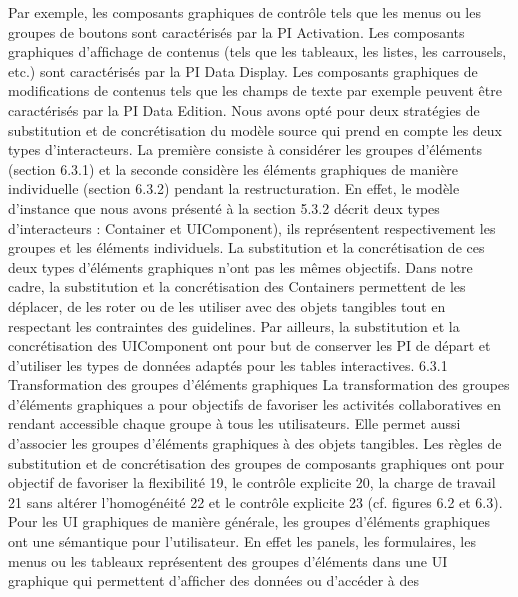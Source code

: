\documentclass{article}
\begin{document}
Par exemple, les composants graphiques de contr\^{o}le tels que les menus ou les groupes de boutons
sont caract\'{e}ris\'{e}s par la PI Activation. Les composants graphiques d’afﬁchage de contenus (tels que
les tableaux, les listes, les carrousels, etc.) sont caract\'{e}ris\'{e}s par la PI Data Display. Les composants
graphiques de modiﬁcations de contenus tels que les champs de texte par exemple peuvent \^{e}tre caract\'{e}ris\'{e}s par la PI Data Edition.
Nous avons opt\'{e} pour deux strat\'{e}gies de substitution et de concr\'{e}tisation du mod\`{e}le source qui
prend en compte les deux types d’interacteurs. La premi\`{e}re consiste \`{a} consid\'{e}rer les groupes d’\'{e}l\'{e}ments (section 6.3.1) et la seconde consid\`{e}re les \'{e}l\'{e}ments graphiques de mani\`{e}re individuelle (section 6.3.2) pendant la restructuration. En effet, le mod\`{e}le d’instance que nous avons pr\'{e}sent\'{e} \`{a} la
section 5.3.2 d\'{e}crit deux types d’interacteurs : Container et UIComponent), ils repr\'{e}sentent respectivement les groupes et les \'{e}l\'{e}ments individuels. La substitution et la concr\'{e}tisation de ces deux types
d’\'{e}l\'{e}ments graphiques n’ont pas les m\^{e}mes objectifs. Dans notre cadre, la substitution et la concr\'{e}tisation des Containers permettent de les d\'{e}placer, de les roter ou de les utiliser avec des objets tangibles
tout en respectant les contraintes des guidelines. Par ailleurs, la substitution et la concr\'{e}tisation des
UIComponent ont pour but de conserver les PI de d\'{e}part et d’utiliser les types de donn\'{e}es adapt\'{e}s
pour les tables interactives.
6.3.1
Transformation des groupes d’\'{e}l\'{e}ments graphiques
La transformation des groupes d’\'{e}l\'{e}ments graphiques a pour objectifs de favoriser les activit\'{e}s collaboratives en rendant accessible chaque groupe \`{a} tous les utilisateurs. Elle permet aussi d’associer les
groupes d’\'{e}l\'{e}ments graphiques \`{a} des objets tangibles. Les r\`{e}gles de substitution et de concr\'{e}tisation
des groupes de composants graphiques ont pour objectif de favoriser la ﬂexibilit\'{e} 19, le contr\^{o}le explicite 20, la charge de travail 21 sans alt\'{e}rer l’homog\'{e}n\'{e}it\'{e} 22 et le contr\^{o}le explicite 23 (cf. ﬁgures 6.2
et 6.3).
Pour les UI graphiques de mani\`{e}re g\'{e}n\'{e}rale, les groupes d’\'{e}l\'{e}ments graphiques ont une s\'{e}mantique pour l’utilisateur. En effet les panels, les formulaires, les menus ou les tableaux repr\'{e}sentent des
groupes d’\'{e}l\'{e}ments dans une UI graphique qui permettent d’afﬁcher des donn\'{e}es ou d’acc\'{e}der \`{a} des
\end{document}
